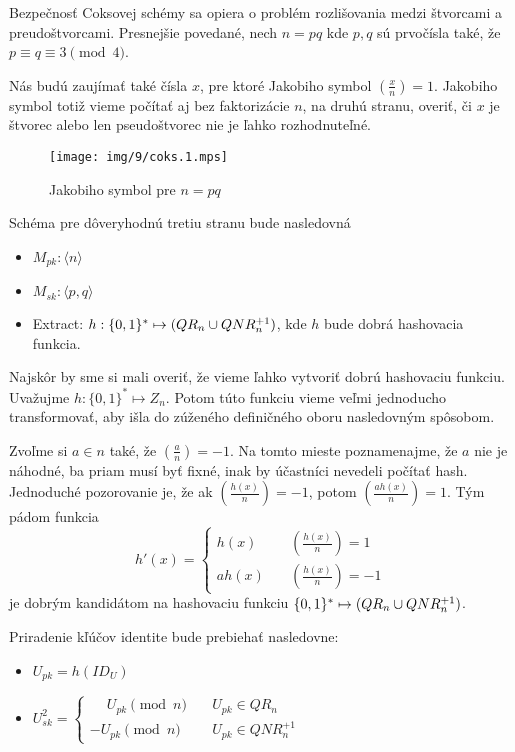 Bezpečnosť Coksovej schémy \cite{cocks} sa opiera o problém rozlišovania medzi
štvorcami a preudoštvorcami. Presnejšie povedané,
nech $n=pq$ kde $p,q$ sú prvočísla také, že $p \equiv q \equiv 3 \pmod{4}$.

\def\jacobi#1#2{\left( \frac{#1}{#2} \right)}

Nás budú zaujímať také čísla $x$, pre ktoré Jakobiho symbol
$\jacobi{x}{n} =1$. Jakobiho symbol totiž vieme počítať aj bez
faktorizácie $n$, na druhú stranu, overiť, či $x$ je štvorec alebo len
pseudoštvorec nie je ľahko rozhodnuteľné.

\begin{figure}[h]
    \centering
    \texttt{[image: img/9/coks.1.mps]}
    \caption{Jakobiho symbol pre $n=pq$}
    \label{fig:jakobi}
\end{figure}


Schéma pre dôveryhodnú tretiu stranu bude nasledovná
\begin{itemize}
    \item $M_{pk}: \langle n \rangle$
    \item $M_{sk}: \langle p,q \rangle$
    \item Extract: $h: \{0,1\}^* \mapsto (QR_n \cup QNR_n^{+1})$,
    kde $h$ bude dobrá hashovacia funkcia.
\end{itemize}

Najskôr by sme si mali overiť, že vieme ľahko vytvoriť dobrú
hashovaciu funkciu. Uvažujme $h:\{0,1\}^* \mapsto Z_n$.
Potom túto funkciu vieme veľmi jednoducho transformovať, aby išla do
zúženého definičného oboru nasledovným spôsobom.

Zvoľme si $a \in n$ také, že $\jacobi{a}{n} = -1$. Na tomto mieste
poznamenajme, že $a$ nie je náhodné, ba priam musí byť fixné, inak by
účastníci nevedeli počítať hash.
Jednoduché pozorovanie je, že ak $\jacobi{h(x)}{n}=-1$,
potom $\jacobi{a h(x)}{n}=1$.
Tým pádom funkcia
\begin{equation*}
h'(x) = \begin{cases}
            h(x)   \quad &\jacobi{h(x)}{n}=1 \\
            a h(x) \quad &\jacobi{h(x)}{n}=-1
        \end{cases}
\end{equation*}
je dobrým kandidátom na hashovaciu funkciu
$\{0,1\}^* \mapsto (QR_n \cup QNR_n^{+1})$.

Priradenie kľúčov identite bude prebiehať nasledovne:
\begin{itemize}
    \item $U_{pk}=h(ID_U)$

    \item $U_{sk}^2=\begin{cases}
            \phantom{-} U_{pk}\pmod{n}  \quad& U_{pk} \in QR_n \\
                     -  U_{pk}\pmod{n}  \quad& U_{pk} \in QNR_n^{+1}
                    \end{cases}$
\end{itemize}

